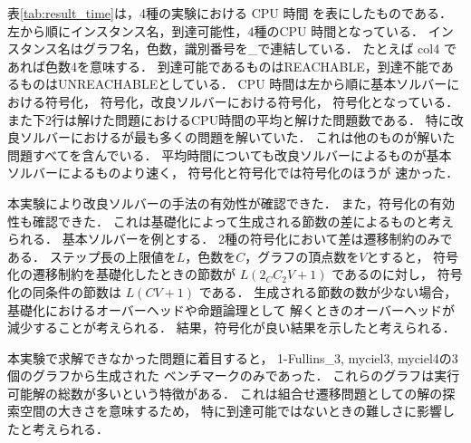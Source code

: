 表\ref{tab:result_time}は，4種の実験における CPU 時間
を表にしたものである．
左から順にインスタンス名，到達可能性，4種のCPU 時間となっている．
インスタンス名はグラフ名，色数，識別番号を\_で連結している．
たとえば col4 であれば色数4を意味する．
到達可能であるものはREACHABLE，到達不能であるものはUNREACHABLEとしている．
CPU 時間は左から順に基本ソルバーにおける符号化，
符号化，改良ソルバーにおける符号化，
符号化となっている．
また下2行は解けた問題におけるCPU時間の平均と解けた問題数である．
特に改良ソルバーにおけるが最も多くの問題を解いていた．
これは他のものが解いた問題すべてを含んでいる．
平均時間についても改良ソルバーによるものが基本ソルバーによるものより速く，
符号化と符号化では符号化のほうが
速かった．

本実験により改良ソルバーの手法の有効性が確認できた．
また，符号化の有効性も確認できた．
これは基礎化によって生成される節数の差によるものと考えられる．
基本ソルバーを例とする．
2種の符号化において差は遷移制約のみである．
ステップ長の上限値を$L$，色数を$C$，グラフの頂点数を$V$とすると，
符号化の遷移制約を基礎化したときの節数が
$L(2 {}_{C}C_{2} V + 1)$
であるのに対し，
符号化の同条件の節数は
$L(CV + 1)$
である．
生成される節数の数が少ない場合，
基礎化におけるオーバーヘッドや命題論理として
解くときのオーバーヘッドが減少することが考えられる．
結果，符号化が良い結果を示したと考えられる．

本実験で求解できなかった問題に着目すると，
1-Fullins\_3, myciel3, myciel4の3個のグラフから生成された
ベンチマークのみであった．
これらのグラフは実行可能解の総数が多いという特徴がある．
これは組合せ遷移問題としての解の探索空間の大きさを意味するため，
特に到達可能ではないときの難しさに影響したと考えられる．

